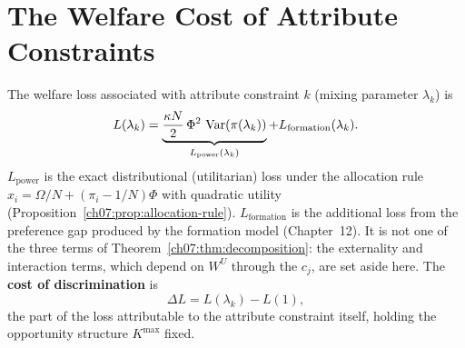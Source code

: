 \documentclass[../structural_economics_book.tex]{subfiles}
\begin{document}
\section{The Welfare Cost of Attribute Constraints}
\label{ch18:sec:welfare}

\begin{definition}\label{ch18:thm:welfare_attribute}
The welfare loss associated with attribute constraint $k$ (mixing parameter $\lambda_k$) is
\begin{equation}\label{ch18:eq:welfare_attribute}
L(\lambda_k) = \underbrace{\frac{\kappa N}{2}\,\Phi^2\,\operatorname{Var}(\pi(\lambda_k))}_{L_{\text{power}}(\lambda_k)} + L_{\text{formation}}(\lambda_k).
\end{equation}
$L_{\text{power}}$ is the exact distributional (utilitarian) loss under the allocation rule $x_i = \Omega/N + (\pi_i - 1/N)\Phi$ with quadratic utility (Proposition~\ref{ch07:prop:allocation-rule}). $L_{\text{formation}}$ is the additional loss from the preference gap produced by the formation model (Chapter~12). It is not one of the three terms of Theorem~\ref{ch07:thm:decomposition}: the externality and interaction terms, which depend on $W^U$ through the $c_j$, are set aside here. The \textbf{cost of discrimination} is
\begin{equation}\label{ch18:eq:gain}
\Delta L = L(\lambda_k) - L(1),
\end{equation}
the part of the loss attributable to the attribute constraint itself, holding the opportunity structure $K^{\max}$ fixed.
\end{definition}
\end{document}
